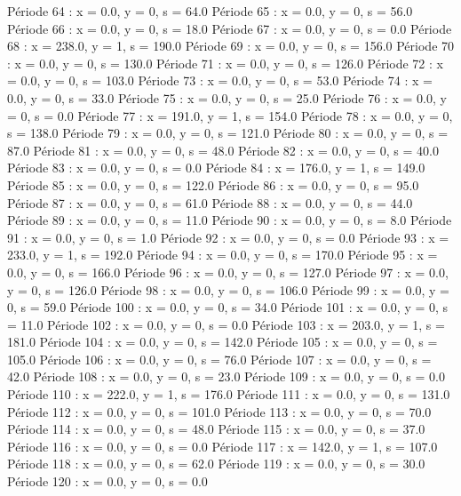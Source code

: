 Période 64 : x = 0.0, y = 0, s = 64.0
Période 65 : x = 0.0, y = 0, s = 56.0
Période 66 : x = 0.0, y = 0, s = 18.0
Période 67 : x = 0.0, y = 0, s = 0.0
Période 68 : x = 238.0, y = 1, s = 190.0
Période 69 : x = 0.0, y = 0, s = 156.0
Période 70 : x = 0.0, y = 0, s = 130.0
Période 71 : x = 0.0, y = 0, s = 126.0
Période 72 : x = 0.0, y = 0, s = 103.0
Période 73 : x = 0.0, y = 0, s = 53.0
Période 74 : x = 0.0, y = 0, s = 33.0
Période 75 : x = 0.0, y = 0, s = 25.0
Période 76 : x = 0.0, y = 0, s = 0.0
Période 77 : x = 191.0, y = 1, s = 154.0
Période 78 : x = 0.0, y = 0, s = 138.0
Période 79 : x = 0.0, y = 0, s = 121.0
Période 80 : x = 0.0, y = 0, s = 87.0
Période 81 : x = 0.0, y = 0, s = 48.0
Période 82 : x = 0.0, y = 0, s = 40.0
Période 83 : x = 0.0, y = 0, s = 0.0
Période 84 : x = 176.0, y = 1, s = 149.0
Période 85 : x = 0.0, y = 0, s = 122.0
Période 86 : x = 0.0, y = 0, s = 95.0
Période 87 : x = 0.0, y = 0, s = 61.0
Période 88 : x = 0.0, y = 0, s = 44.0
Période 89 : x = 0.0, y = 0, s = 11.0
Période 90 : x = 0.0, y = 0, s = 8.0
Période 91 : x = 0.0, y = 0, s = 1.0
Période 92 : x = 0.0, y = 0, s = 0.0
Période 93 : x = 233.0, y = 1, s = 192.0
Période 94 : x = 0.0, y = 0, s = 170.0
Période 95 : x = 0.0, y = 0, s = 166.0
Période 96 : x = 0.0, y = 0, s = 127.0
Période 97 : x = 0.0, y = 0, s = 126.0
Période 98 : x = 0.0, y = 0, s = 106.0
Période 99 : x = 0.0, y = 0, s = 59.0
Période 100 : x = 0.0, y = 0, s = 34.0
Période 101 : x = 0.0, y = 0, s = 11.0
Période 102 : x = 0.0, y = 0, s = 0.0
Période 103 : x = 203.0, y = 1, s = 181.0
Période 104 : x = 0.0, y = 0, s = 142.0
Période 105 : x = 0.0, y = 0, s = 105.0
Période 106 : x = 0.0, y = 0, s = 76.0
Période 107 : x = 0.0, y = 0, s = 42.0
Période 108 : x = 0.0, y = 0, s = 23.0
Période 109 : x = 0.0, y = 0, s = 0.0
Période 110 : x = 222.0, y = 1, s = 176.0
Période 111 : x = 0.0, y = 0, s = 131.0
Période 112 : x = 0.0, y = 0, s = 101.0
Période 113 : x = 0.0, y = 0, s = 70.0
Période 114 : x = 0.0, y = 0, s = 48.0
Période 115 : x = 0.0, y = 0, s = 37.0
Période 116 : x = 0.0, y = 0, s = 0.0
Période 117 : x = 142.0, y = 1, s = 107.0
Période 118 : x = 0.0, y = 0, s = 62.0
Période 119 : x = 0.0, y = 0, s = 30.0
Période 120 : x = 0.0, y = 0, s = 0.0



